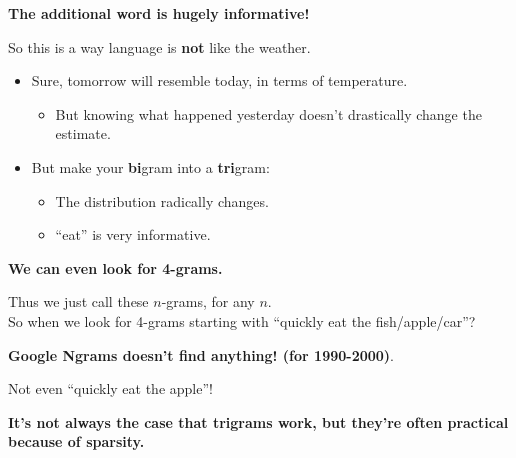 \documentclass{beamer}
\newcommand{\pagestepalt}[2]{
  \begin{frame}[t]
    \begin{minipage}[t][0.26\textheight][t]{\textwidth}
      \begin{center}
        \huge
        \textbf{#1}
      \end{center}
    \end{minipage}
    
    \begin{minipage}[t][0.7\textheight][t]{\textwidth}
      #2
    \end{minipage}
  \end{frame}
}
\begin{document}
\pagestepalt{The additional word is hugely informative!}{
  So this is a way language is \textbf{not} like the weather.\pause
  \begin{itemize}
  \item Sure, tomorrow will resemble today, in terms of temperature.
    \begin{itemize}
    \item But knowing what happened yesterday  doesn't drastically
      change the estimate.
    \end{itemize}\pause
  \item But make your \alert{{\bf bi}gram} into a \alert{{\bf tri}gram}:
    \begin{itemize}
    \item The distribution radically changes.
    \item ``eat'' is very informative.
    \end{itemize}
  \end{itemize}
}

\pagestepalt{We can even look for \alert{4-grams}.}{
  Thus we just call these \alert{$n$-grams}, for any $n$. \\
  So when we look for 4-grams starting with ``quickly eat the fish/apple/car''? \pause
  \begin{center}
    \large\textbf{Google Ngrams doesn't find anything! (for 1990-2000)}.
  \end{center}\pause
  Not even ``quickly eat the apple''!\pause
  \begin{center}
    \textbf{It's not always the case that trigrams work, but they're often practical because of \alert{sparsity}.}
  \end{center}
  
}


  
\end{document}
